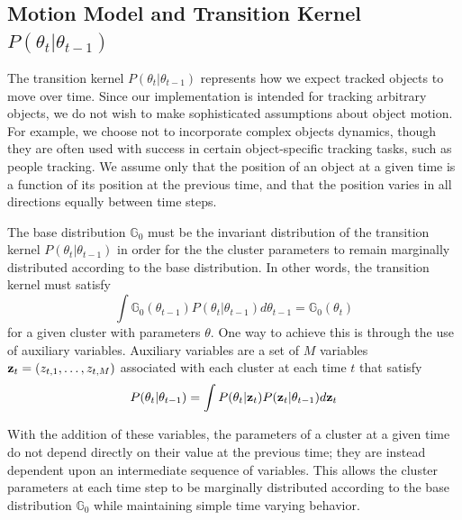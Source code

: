 \documentclass[twocolumn, final]{svjour3}
\begin{document}
\subsection{Motion Model and Transition Kernel $P(\theta_{t} | \theta_{t-1})$}
\label{sec:motionmodel}

The transition kernel $P(\theta_{t} | \theta_{t-1})$ represents how we expect tracked objects to move over time. Since our implementation is intended for tracking arbitrary objects, we do not wish to make sophisticated assumptions about object motion. For example, we choose not to incorporate complex objects dynamics, though they are often used with success in certain object-specific tracking tasks, such as people tracking. We assume only that the position of an object at a given time is a function of its position at the previous time, and that the position varies in all directions equally between time steps.

The base distribution $\mathbb{G}_{0}$ must be the invariant distribution of the transition kernel $P(\theta_{t} | \theta_{t-1})$ in order for the the cluster parameters to remain marginally distributed according to the base distribution. In other words, the transition kernel must satisfy
\begin{equation}
\int \mathbb{G}_{0}(\theta_{t-1})P(\theta_{t} | \theta_{t-1}) d\theta_{t-1} = \mathbb{G}_{0}(\theta_{t})
\end{equation}
for a given cluster with parameters $\theta$. One way to achieve this is through the use of auxiliary variables. Auxiliary variables are a set of $M$ variables $\bold{z}_{t} = (z_{t,1}, \ldots, z_{t,M})$ associated with each cluster at each time $t$ that satisfy
\begin{eqnarray}
\label{auxiliaryvariablecriteria}
P(\theta_{t} | \theta_{t-1}) = \int P(\theta_{t} | \bold{z}_{t}) P(\bold{z}_{t} | \theta_{t-1}) d \bold{z}_{t}
\end{eqnarray}

With the addition of these variables, the parameters of a cluster at a given time do not depend directly on their value at the previous time; they are instead dependent upon an intermediate sequence of variables. This allows the cluster parameters at each time step to be marginally distributed according to the base distribution $\mathbb{G}_{0}$ while maintaining simple time varying behavior.
\end{document}
